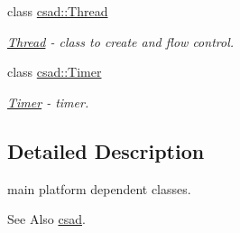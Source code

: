 \begin{DoxyCompactItemize}
class \hyperlink{classcsad_1_1_thread}{csad\-::\-Thread}
\begin{DoxyCompactList}\small\item\em \hyperlink{classcsad_1_1_thread}{Thread} -\/ class to create and flow control. \end{DoxyCompactList}\item 
class \hyperlink{classcsad_1_1_timer}{csad\-::\-Timer}
\begin{DoxyCompactList}\small\item\em \hyperlink{classcsad_1_1_timer}{Timer} -\/ timer. \end{DoxyCompactList}\end{DoxyCompactItemize}


\subsection{Detailed Description}
main platform dependent classes. \begin{DoxySeeAlso}{See Also}
\hyperlink{namespacecsad}{csad}. 
\end{DoxySeeAlso}
